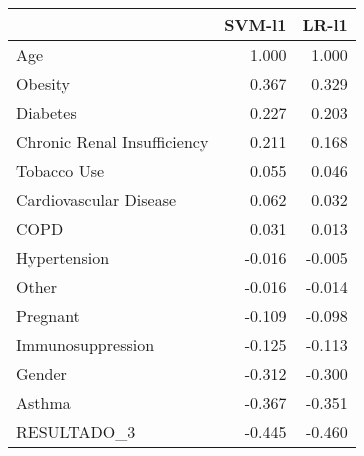 \begin{tabular}{lrr}
\toprule
{} &  SVM-l1 &  LR-l1 \\
\midrule
Age                         &   1.000 &  1.000 \\
Obesity                     &   0.367 &  0.329 \\
Diabetes                    &   0.227 &  0.203 \\
Chronic Renal Insufficiency &   0.211 &  0.168 \\
Tobacco Use                 &   0.055 &  0.046 \\
Cardiovascular Disease      &   0.062 &  0.032 \\
COPD                        &   0.031 &  0.013 \\
Hypertension                &  -0.016 & -0.005 \\
Other                       &  -0.016 & -0.014 \\
Pregnant                    &  -0.109 & -0.098 \\
Immunosuppression           &  -0.125 & -0.113 \\
Gender                      &  -0.312 & -0.300 \\
Asthma                      &  -0.367 & -0.351 \\
RESULTADO\_3                 &  -0.445 & -0.460 \\
\bottomrule
\end{tabular}

